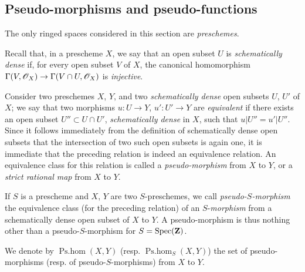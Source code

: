 \subsection{Pseudo-morphisms and pseudo-functions}

The only ringed spaces considered in this section are \emph{preschemes}.

\begin{env}[20.2.1]\label{IV.20.2.1}
Recall  that, in a prescheme $X$, we say that an open subset $U$ is \emph{schematically dense} if, for every open subset $V$ of $X$, the canonical homomorphism $\Gamma(V,\mathscr{O}_X)\to\Gamma(V\cap U,\mathscr{O}_X)$ is \emph{injective}.

Consider two preschemes $X$, $Y$, and two \emph{schematically dense} open subsets $U$, $U'$ of $X$; we say that two morphisms $u:U\to Y$, $u':U'\to Y$ are \emph{equivalent} if there exists an open subset $U''\subset U\cap U'$, \emph{schematically dense} in $X$, such that $u|U''=u'|U''$.
Since it follows immediately from the definition of schematically dense open subsets that the intersection of two such open subsets is again one, it is immediate that the preceding relation is indeed an equivalence relation.
An equivalence class for this relation is called a \emph{pseudo-morphism} from $X$ to $Y$, or a \emph{strict rational map} from $X$ to $Y$.

If $S$ is a prescheme and $X$, $Y$ are two $S$-preschemes, we call \emph{pseudo-$S$-morphism} the equivalence class (for the preceding relation) of an $S$-\emph{morphism} from a schematically dense open subset of $X$ to $Y$.
A pseudo-morphism is thus nothing other than a pseudo-$S$-morphism for $S=\operatorname{Spec}(\mathbf{Z})$.

We denote by $\operatorname{Ps.hom}(X,Y)$ (resp. $\operatorname{Ps.hom}_S(X,Y)$) the set of pseudo-morphisms (resp. of pseudo-$S$-morphisms) from $X$ to $Y$.
\end{env}

